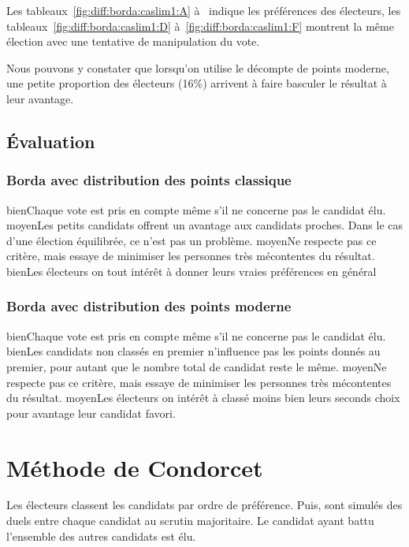 \documentclass[../report]{subfiles}
\begin{document}
  Les tableaux~\ref{fig:diff:borda:caslim1:A} à~ indique les 
  préférences des électeurs, les tableaux~\ref{fig:diff:borda:caslim1:D} 
  à~\ref{fig:diff:borda:caslim1:F} montrent la même élection avec une tentative de manipulation 
  du vote.

  Nous pouvons y constater que lorsqu'on utilise le décompte de points moderne, une petite 
  proportion des électeurs (16\%) arrivent à faire basculer le résultat à leur avantage.


  \subsection{Évaluation}
  \subsubsection{Borda avec distribution des points classique}
  \tabcritere%
    {bien}{Chaque vote est pris en compte même s'il ne concerne pas le candidat élu.}%
    {moyen}{Les petits candidats offrent un avantage aux candidats proches. Dans le cas d'une élection équilibrée, ce n'est pas un problème.}%
    {moyen}{Ne respecte pas ce critère, mais essaye de minimiser les personnes très mécontentes du résultat.}%
    {bien}{Les électeurs on tout intérêt à donner leurs vraies préférences en général}
  \subsubsection{Borda avec distribution des points moderne}
  \tabcritere%
    {bien}{Chaque vote est pris en compte même s'il ne concerne pas le candidat élu.}%
    {bien}{Les candidats non classés en premier n'influence pas les points donnés au premier, pour autant que le nombre total de candidat reste le même.}%
    {moyen}{Ne respecte pas ce critère, mais essaye de minimiser les personnes très mécontentes du résultat.}%
    {moyen}{Les électeurs on intérêt à classé moins bien leurs seconds choix pour avantage leur candidat favori.}


  \section{Méthode de Condorcet}

  Les électeurs classent les candidats par ordre de préférence. 
  Puis, sont simulés des duels entre chaque candidat au scrutin majoritaire.
  Le candidat ayant battu l'ensemble des autres candidats est élu.
\end{document}
